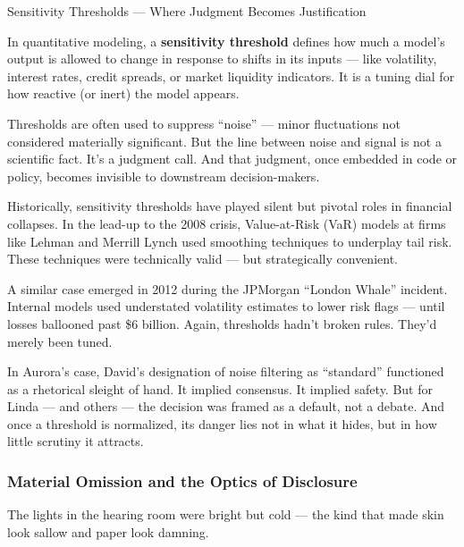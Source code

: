 \medskip

\begin{TechnicalSidebar}{Sensitivity Thresholds — Where Judgment Becomes Justification}

  In quantitative modeling, a \textbf{sensitivity threshold} defines how much a model’s output is allowed 
  to change in response to shifts in its inputs — like volatility, interest rates, credit spreads, or market 
  liquidity indicators. It is a tuning dial for how reactive (or inert) the model appears.

  \medskip
  
  Thresholds are often used to suppress ``noise'' — minor fluctuations not considered materially significant. 
  But the line between noise and signal is not a scientific fact. It’s a judgment call. And that judgment, 
  once embedded in code or policy, becomes invisible to downstream decision-makers.

  \medskip
  
  Historically, sensitivity thresholds have played silent but pivotal roles in financial collapses. In the 
  lead-up to the 2008 crisis, Value-at-Risk (VaR) models at firms like Lehman and Merrill Lynch used smoothing 
  techniques to underplay tail risk. These techniques were technically valid — but strategically convenient.

  \medskip
  
  A similar case emerged in 2012 during the JPMorgan ``London Whale'' incident. Internal models used 
  understated volatility estimates to lower risk flags — until losses ballooned past \$6 billion. Again, 
  thresholds hadn’t broken rules. They’d merely been tuned.

  \medskip
  
  In Aurora’s case, David’s designation of noise filtering as ``standard'' functioned as a rhetorical sleight 
  of hand. It implied consensus. It implied safety. But for Linda — and others — the decision was framed as a 
  default, not a debate. And once a threshold is normalized, its danger lies not in what it hides, but in 
  how little scrutiny it attracts.
  
\end{TechnicalSidebar}
  
\subsubsection{Material Omission and the Optics of Disclosure}

The lights in the hearing room were bright but cold — the kind that made skin look sallow and paper look damning.

